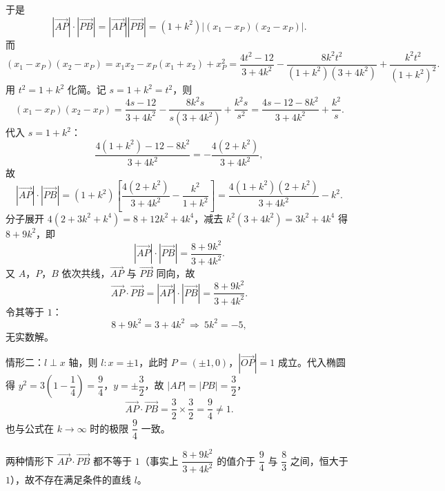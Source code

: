 \begin{answer}
于是
\nopagebreak[4]
\[|\overrightarrow{AP}|\cdot|\overrightarrow{PB}|=|\overrightarrow{AP}||\overrightarrow{PB}|=(1+k^2)\left|(x_1-x_P)(x_2-x_P)\right|.\]
而
\nopagebreak[4]
\[(x_1-x_P)(x_2-x_P)=x_1x_2-x_P(x_1+x_2)+x_P^2
=\frac{4t^2-12}{3+4k^2}-\frac{8k^2t^2}{(1+k^2)(3+4k^2)}+\frac{k^2t^2}{(1+k^2)^2}.\]
用 $t^2=1+k^2$ 化简。记 $s=1+k^2=t^2$，则
\nopagebreak[4]
\[(x_1-x_P)(x_2-x_P)=\frac{4s-12}{3+4k^2}-\frac{8k^2s}{s(3+4k^2)}+\frac{k^2s}{s^2}
=\frac{4s-12-8k^2}{3+4k^2}+\frac{k^2}{s}.\]
代入 $s=1+k^2$：
\nopagebreak[4]
\[\frac{4(1+k^2)-12-8k^2}{3+4k^2}=-\frac{4(2+k^2)}{3+4k^2},\]
故
\nopagebreak[4]
\[|\overrightarrow{AP}|\cdot|\overrightarrow{PB}|=(1+k^2)\left[\frac{4(2+k^2)}{3+4k^2}-\frac{k^2}{1+k^2}\right]
=\frac{4(1+k^2)(2+k^2)}{3+4k^2}-k^2.\]
分子展开 $4(2+3k^2+k^4)=8+12k^2+4k^4$，减去 $k^2(3+4k^2)=3k^2+4k^4$ 得 $8+9k^2$，即
\nopagebreak[4]
\[|\overrightarrow{AP}|\cdot|\overrightarrow{PB}|=\frac{8+9k^2}{3+4k^2}.\]
又 $A$，$P$，$B$ 依次共线，$\overrightarrow{AP}$ 与 $\overrightarrow{PB}$ 同向，故
\nopagebreak[4]
\[\overrightarrow{AP}\cdot\overrightarrow{PB}=|\overrightarrow{AP}|\cdot|\overrightarrow{PB}|=\frac{8+9k^2}{3+4k^2}.\]
令其等于 $1$：
\nopagebreak[4]
\[8+9k^2=3+4k^2\ \Longrightarrow\ 5k^2=-5,\]
无实数解。

情形二：$l\perp x$ 轴，则 $l:x=\pm 1$，此时 $P=(\pm1,0)$，$|\overrightarrow{OP}|=1$ 成立。代入椭圆得 $y^2=3\left(1-\dfrac14\right)=\dfrac94$，$y=\pm\dfrac32$，故 $|AP|=|PB|=\dfrac32$，
\nopagebreak[4]
\[\overrightarrow{AP}\cdot\overrightarrow{PB}=\frac32\times\frac32=\frac94\neq 1.\]
也与公式在 $k\to\infty$ 时的极限 $\dfrac94$ 一致。

两种情形下 $\overrightarrow{AP}\cdot\overrightarrow{PB}$ 都不等于 $1$（事实上 $\dfrac{8+9k^2}{3+4k^2}$ 的值介于 $\dfrac94$ 与 $\dfrac83$ 之间，恒大于 $1$），故不存在满足条件的直线 $l$。


\end{answer}
